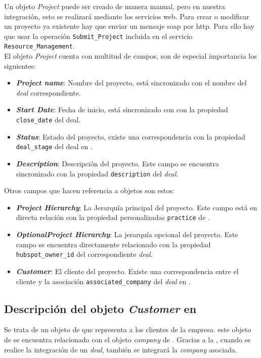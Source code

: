 Un objeto \textit{Project} puede ser creado de manera manual, pero en nuestra integración, esto se realizará mediante los servicios web.
Para crear o modificar un proyecto ya existente hay que enviar un mensaje \acrshort{soap} por \acrshort{http}. 
Para ello hay que usar la operación \texttt{Submit\_Project}  incluida en el servicio \texttt{Resource\_Management}.\\

El objeto \textit{Project} cuenta con multitud de campos, son de especial importancia los siguientes: 

\begin{itemize}
\item \textbf{\textit{Project name}}: Nombre del proyecto, está sincronizado con el nombre del \textit{deal} correspondiente.
\item \textbf{\textit{Start Date}}: Fecha de inicio, está sincronizado con con la propiedad \texttt{close\_date} del deal.
\item \textbf{\textit{Status}}: Estado del proyecto, existe una correspondencia con la propiedad \texttt{deal\_stage} del deal en \hs{}.
\item \textbf{\textit{Description}}: Descripción del proyecto. Este campo se encuentra sincronizado con la propiedad \texttt{description} del \textit{deal}.
\end{itemize}

Otros campos que hacen referencia a objetos son estos: 
\begin{itemize}
\item \textbf{\textit{Project Hierarchy}}: La Jerarquía principal del proyecto. Este campo está en directa relación con la propiedad personalizadas
\texttt{practice} de \hs.
\item \textbf{\textit{OptionalProject Hierarchy}}: La jerarquía opcional del proyecto. Este campo se encuentra directamente relacionado con la propiedad \texttt{hubspot\_owner\_id} del correspondiente \textit{deal}.
\item \textbf{\textit{Customer}}: El cliente del proyecto. Existe una correspondencia entre el cliente y la asociación \texttt{associated\_company} del \textit{deal} en \hs{}.

\end{itemize}



\subsection{Descripción del objeto \textit{Customer} en \wday{}}
Se trata de un objeto de \wday{} que representa a los clientes de la empresa. este objeto de \wday{} se encuentra relacionado con el objeto \textit{company} de \hs. 
Gracias a la \iface{}, cuando se realice la integración de un \textit{deal}, también se integrará la \textit{company} asociada.

